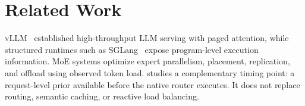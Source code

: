 \section{Related Work}

vLLM~\cite{vllm} established high-throughput LLM serving with paged attention,
while structured runtimes such as SGLang~\cite{sglang} expose program-level
execution information. MoE systems optimize expert parallelism, placement,
replication, and offload using observed token load. \project studies a
complementary timing point: a request-level prior available before the native
router executes. It does not replace routing, semantic caching, or reactive
load balancing.
